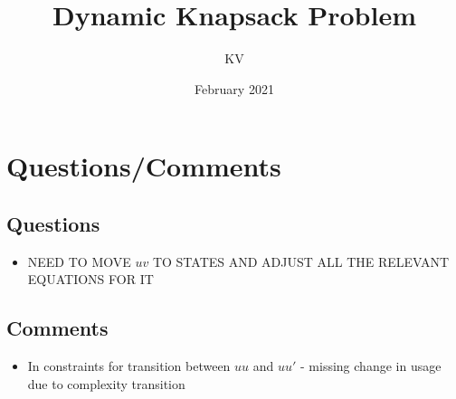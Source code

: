 \documentclass{article}
\title{Dynamic Knapsack Problem}
\author{KV}
\date{February 2021}
\begin{document}
\maketitle
\tableofcontents

\section{Questions/Comments}

\subsection{Questions}
\begin{itemize}
	\item  NEED TO MOVE $uv$ TO STATES AND ADJUST ALL THE RELEVANT EQUATIONS FOR IT
\end{itemize}

\subsection{Comments}
\begin{itemize}
	\item In constraints for transition between $uu$ and $uu'$ - missing change in usage due to complexity transition
\end{itemize}
\end{document}

